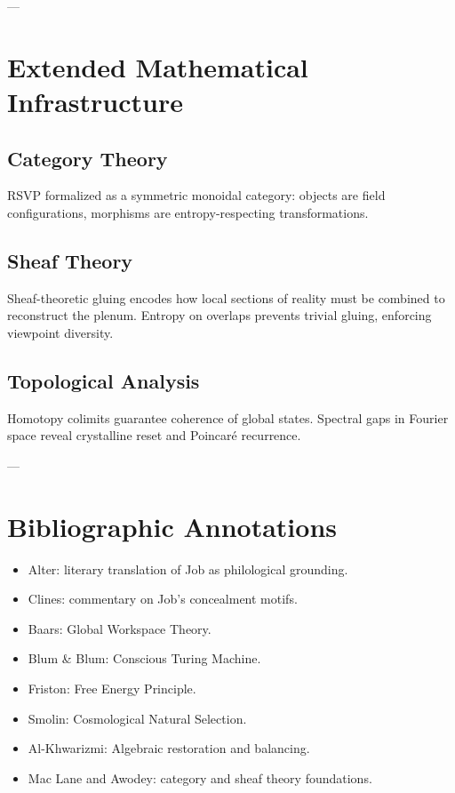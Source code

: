 ---

\chapter{Extended Mathematical Infrastructure}
\section*{Category Theory}
RSVP formalized as a symmetric monoidal category: objects are field configurations, morphisms are entropy-respecting transformations.  

\section*{Sheaf Theory}
Sheaf-theoretic gluing encodes how local sections of reality must be combined to reconstruct the plenum.  
Entropy on overlaps prevents trivial gluing, enforcing viewpoint diversity.  

\section*{Topological Analysis}
Homotopy colimits guarantee coherence of global states.  
Spectral gaps in Fourier space reveal crystalline reset and Poincaré recurrence.  

---

\chapter{Bibliographic Annotations}
\begin{itemize}
    \item Alter: literary translation of Job as philological grounding.  
    \item Clines: commentary on Job’s concealment motifs.  
    \item Baars: Global Workspace Theory.  
    \item Blum \& Blum: Conscious Turing Machine.  
    \item Friston: Free Energy Principle.  
    \item Smolin: Cosmological Natural Selection.  
    \item Al-Khwarizmi: Algebraic restoration and balancing.  
    \item Mac Lane and Awodey: category and sheaf theory foundations.  
\end{itemize}
